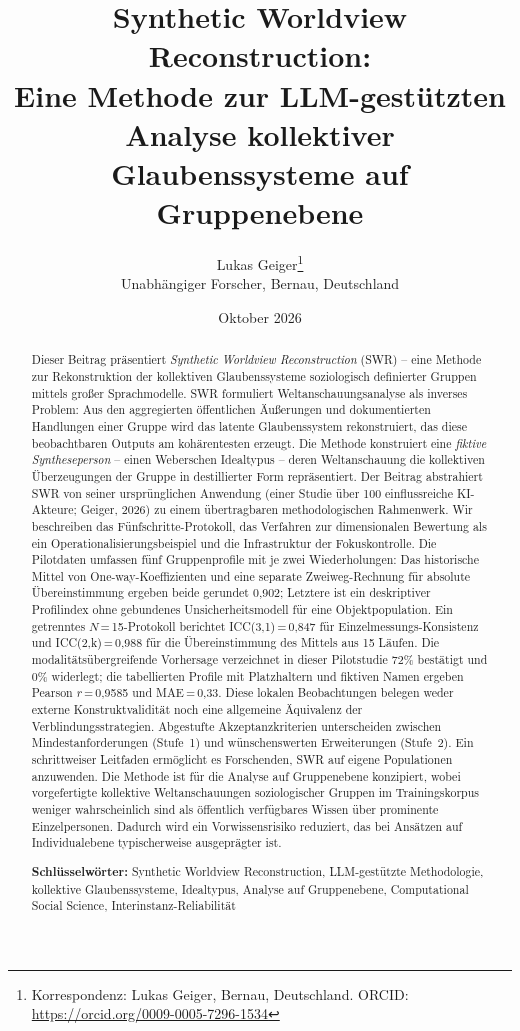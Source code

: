 \documentclass[11pt,a4paper]{article}
\title{%
  \sffamily\bfseries
  Synthetic Worldview Reconstruction:\\[0.3em]
  \large Eine Methode zur LLM-gestützten\\
  Analyse kollektiver Glaubenssysteme auf Gruppenebene%
}
\author{%
  Lukas Geiger\thanks{Korrespondenz: Lukas Geiger, Bernau, Deutschland. ORCID: \url{https://orcid.org/0009-0005-7296-1534}}\\[0.3em]
  \small Unabhängiger Forscher, Bernau, Deutschland
}
\date{Oktober 2026}
\begin{document}
\hypersetup{pageanchor=false}
\maketitle
\thispagestyle{empty}

\begin{abstract}
\noindent
Dieser Beitrag präsentiert \emph{Synthetic Worldview Reconstruction} (SWR) -- eine Methode zur Rekonstruktion der kollektiven Glaubenssysteme soziologisch definierter Gruppen mittels großer Sprachmodelle. SWR formuliert Weltanschauungsanalyse als inverses Problem: Aus den aggregierten öffentlichen Äußerungen und dokumentierten Handlungen einer Gruppe wird das latente Glaubenssystem rekonstruiert, das diese beobachtbaren Outputs am kohärentesten erzeugt. Die Methode konstruiert eine \emph{fiktive Syntheseperson} -- einen Weberschen Idealtypus -- deren Weltanschauung die kollektiven Überzeugungen der Gruppe in destillierter Form repräsentiert. Der Beitrag abstrahiert SWR von seiner ursprünglichen Anwendung (einer Studie über 100 einflussreiche KI-Akteure; Geiger, 2026) zu einem übertragbaren methodologischen Rahmenwerk. Wir beschreiben das Fünfschritte-Protokoll, das Verfahren zur dimensionalen Bewertung als ein Operationalisierungsbeispiel und die Infrastruktur der Fokuskontrolle. Die Pilotdaten umfassen fünf Gruppenprofile mit je zwei Wiederholungen: Das historische Mittel von One-way-Koeffizienten und eine separate Zweiweg-Rechnung für absolute Übereinstimmung ergeben beide gerundet 0,902; Letztere ist ein deskriptiver Profilindex ohne gebundenes Unsicherheitsmodell für eine Objektpopulation. Ein getrenntes $N$\,=\,15-Protokoll berichtet ICC(3,1)\,=\,0,847 für Einzelmessungs-Konsistenz und ICC(2,k)\,=\,0,988 für die Übereinstimmung des Mittels aus 15 Läufen. Die modalitätsübergreifende Vorhersage verzeichnet in dieser Pilotstudie 72\% bestätigt und 0\% widerlegt; die tabellierten Profile mit Platzhaltern und fiktiven Namen ergeben Pearson $r$\,=\,0,9585 und MAE\,=\,0,33. Diese lokalen Beobachtungen belegen weder externe Konstruktvalidität noch eine allgemeine Äquivalenz der Verblindungsstrategien. Abgestufte Akzeptanzkriterien unterscheiden zwischen Mindestanforderungen (Stufe~1) und wünschenswerten Erweiterungen (Stufe~2). Ein schrittweiser Leitfaden ermöglicht es Forschenden, SWR auf eigene Populationen anzuwenden. Die Methode ist für die Analyse auf Gruppenebene konzipiert, wobei vorgefertigte kollektive Weltanschauungen soziologischer Gruppen im Trainingskorpus weniger wahrscheinlich sind als öffentlich verfügbares Wissen über prominente Einzelpersonen. Dadurch wird ein Vorwissensrisiko reduziert, das bei Ansätzen auf Individualebene typischerweise ausgeprägter ist.

\medskip
\noindent\textbf{Schlüsselwörter:} \small Synthetic Worldview Reconstruction, LLM-gestützte Methodologie, kollektive Glaubenssysteme, Idealtypus, Analyse auf Gruppenebene, Computational Social Science, Interinstanz-Reliabilität
\end{abstract}
\end{document}
